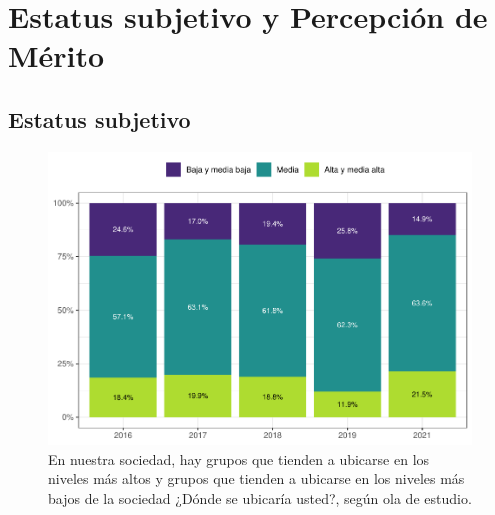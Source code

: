 \documentclass[
  12pt,
]{book}
\begin{document}
\hypertarget{estatus-subjetivo-y-percepciuxf3n-de-muxe9rito}{%
\section{Estatus subjetivo y Percepción de Mérito}\label{estatus-subjetivo-y-percepciuxf3n-de-muxe9rito}}

\hypertarget{estatus-subjetivo}{%
\subsection{Estatus subjetivo}\label{estatus-subjetivo}}

\begin{figure}

{\centering \includegraphics{reporte-elsoc_files/figure-latex/ess-ola-1} 

}

\caption{En nuestra sociedad, hay grupos que tienden a ubicarse en los niveles más altos y grupos que tienden a ubicarse en los niveles más bajos de la sociedad ¿Dónde se ubicaría usted?, según ola de estudio.}\label{fig:ess-ola}
\end{figure}
\end{document}
